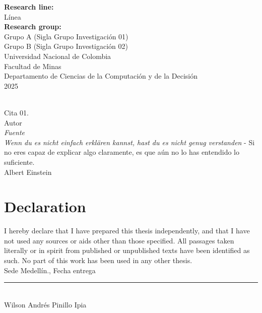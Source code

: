 \documentclass[10pt,english,fleqn,openany,twoside,letterpaper]{book}
\newcommand{\studentname}{}
\newcommand{\submissiondate}{}
\newcommand{\resgroupone}{}
\newcommand{\resgrouptwo}{}
\newcommand{\researchtopic}{}
\newcommand{\codirector}{} %
\newcommand{\codirectortitle}{} %
\newcommand{\issuedate}{}
\newcommand{\sede}{}
\newcommand{\department}{}
\newcommand{\faculty}{}
\newcommand{\university}{Universidad Nacional de Colombia}
\renewcommand{\studentname}{Wilson Andrés Pinillo Ipia}
\renewcommand{\issuedate}{2025}
\renewcommand{\submissiondate}{Fecha entrega}
\renewcommand{\resgroupone}{Grupo A (Sigla Grupo Investigación 01) }
\renewcommand{\resgrouptwo}{Grupo B (Sigla Grupo Investigación 02) }
\renewcommand{\researchtopic}{Línea}
\renewcommand{\sede}{Sede Medellín}
\renewcommand{\department}{Departamento de Ciencias de la Computación y de la Decisión}
\renewcommand{\faculty}{Facultad de Minas}
\begin{document}
{\begin{center}
\textbf{Research line:} \\ 
\researchtopic\\
\textbf{Research group:} \\
\resgroupone \\
\resgrouptwo \\
\vspace{1.5cm} 
\university \\
\faculty \\
\department \\
\issuedate
\end{center}

\newpage
\thispagestyle{empty}
\begin{flushright}
\begin{minipage}{12.5cm}
\noindent
\\[10em]
{\Large Cita 01.}
\\[3em]
Autor
\\ \textit{Fuente}
\\[10em]
{\Large \textit{Wenn du es nicht einfach erkl\"{a}ren kannst, hast du es nicht genug verstanden} - Si no eres capaz de explicar algo claramente, es que aún no lo has entendido lo suficiente.}
\\[3em]
Albert Einstein
\end{minipage}
\end{flushright} 


\newpage
\chapter*{\sffamily Declaration}
\par I hereby declare that I have prepared this thesis independently, and that I have not used any sources or aids other than those specified. All passages taken literally or in spirit from published or unpublished texts have been identified as such. No part of this work has been used in any other thesis.
\\[1em]
\sede., \submissiondate
\\[6em]
\rule{6cm}{0.5pt}\\
\studentname
}
\end{document}
